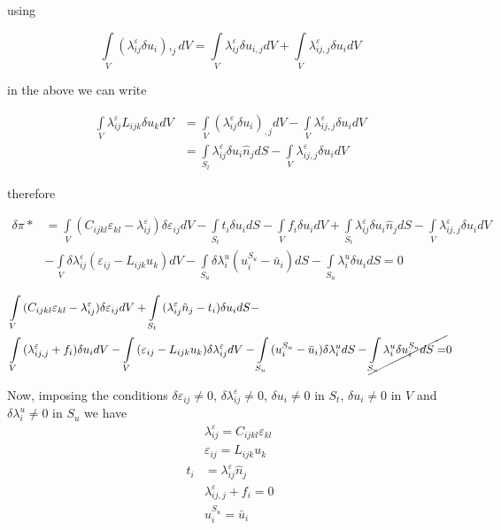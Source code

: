 using

\[\int\limits_V {(\lambda _{ij}^\varepsilon \delta {u_i}){,_j}dV = } \int\limits_V {\lambda _{ij}^\varepsilon \delta {u_{i,j}}dV}  + \int\limits_V {\lambda _{ij,j}^\varepsilon \delta {u_i}dV} \]

in the above we can write

\begin{align*}
\int\limits_V {\lambda _{ij}^\varepsilon {L_{ijk}}\delta {u_k}dV} & = \int\limits_V {{{(\lambda _{ij}^\varepsilon \delta {u_i})}_{,j}}dV}  - \int\limits_V {\lambda _{ij,j}^\varepsilon \delta {u_i}dV}\\
& = \int\limits_{{S_t}} {\lambda _{ij}^\varepsilon \delta {u_i}{{\hat n}_j}dS}  - \int\limits_V {\lambda _{ij,j}^\varepsilon \delta {u_i}dV}
\end{align*}

therefore


\begin{align*}
\delta \pi * &= \int\limits_V {({C_{ijkl}}{\varepsilon _{kl}} - \lambda _{ij}^\varepsilon )\delta {\varepsilon _{ij}}dV - \int\limits_{{S_t}} {{t_i}\delta {u_i}dS}  - \int\limits_V {{f_i}\delta {u_i}dV + } } \int\limits_{{S_t}} {\lambda _{ij}^\varepsilon \delta {u_i}{{\hat n}_j}dS}  - \int\limits_V {\lambda _{ij,j}^\varepsilon \delta {u_i}dV}\\
&- \int\limits_V {\delta \lambda _{ij}^\varepsilon ({\varepsilon _{ij}} - {L_{ijk}}{u_k})dV}  - \int\limits_{{S_u}} {\delta \lambda _i^u(u_i^{{S_u}} - {{\bar u}_i})dS}  - \int\limits_{{S_u}} {\lambda _i^u\delta {u_i}dS}  = 0
\end{align*}


\begin{align*}
&\int\limits_V {({C_{ijkl}}{\varepsilon _{kl}} - \lambda _{ij}^\varepsilon )\delta {\varepsilon _{ij}}dV
+ \int\limits_{{S_t}} {(\lambda _{ij}^\varepsilon {{\hat n}_j} - {t_i})\delta {u_i}dS}  - }\\
&\int\limits_V {(\lambda _{ij,j}^\varepsilon  + {f_i})\delta {u_i}dV}
- \int\limits_V {({\varepsilon _{ij}} - {L_{ijk}}{u_k})\delta \lambda _{ij}^\varepsilon dV}
- \int\limits_{{S_u}} {(u_i^{{S_u}} - {{\bar u}_i})\delta \lambda _i^udS}  - \cancel{\int\limits_{{S_u}} {\lambda _i^u\delta u_i^{{S_u}}dS} = } 0
\end{align*}


Now, imposing the conditions $\delta {\varepsilon _{ij}} \neq 0$, $\delta \lambda _{ij}^\varepsilon  \neq 0$, $\delta {u_i} \neq 0$ in $S_t$, $\delta {u_i} \neq 0$ in $V$ and $\delta \lambda _i^u \neq 0$ in $S_u$ we have
%
\begin{align}
&\lambda _{ij}^\varepsilon  = C_{ijkl} \varepsilon_{kl}\\
&\varepsilon_{ij} = {L_{ijk}}{u_k}\\
t_i &= \lambda_{ij}^\varepsilon \hat{n}_j\\
&\lambda _{ij,j}^\varepsilon  + {f_i} = 0\\
&u_i^{S_u} = \bar{u}_i
\end{align}

